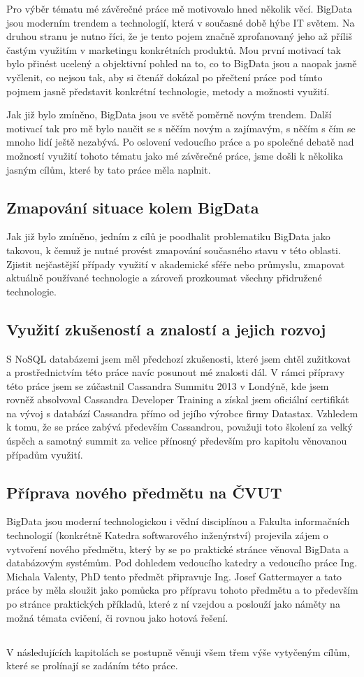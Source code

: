 Pro výběr tématu mé závěrečné práce mě motivovalo hned několik věcí. BigData jsou moderním trendem a technologií, která v současné době hýbe IT světem. Na druhou stranu je nutno říci, že je tento pojem značně zprofanovaný jeho až příliš častým využitím v marketingu konkrétních produktů. Mou první motivací tak bylo přinést ucelený a objektivní pohled na to, co to BigData jsou a naopak jasně vyčlenit, co nejsou tak, aby si čtenář dokázal po přečtení práce pod tímto pojmem jasně představit konkrétní technologie, metody a možnosti využití. 

Jak již bylo zmíněno, BigData jsou ve světě poměrně novým trendem. Další motivací tak pro mě bylo naučit se s něčím novým a zajímavým, s něčím s čím se mnoho lidí ještě nezabývá. Po oslovení vedoucího práce a po společné debatě nad možností využití tohoto tématu jako mé závěrečné práce, jsme došli k několika jasným cílům, které by tato práce měla naplnit. 

\subsection{Zmapování situace kolem BigData}
Jak již bylo zmíněno, jedním z cílů je poodhalit problematiku BigData jako takovou, k čemuž je nutné provést zmapování současného stavu v této oblasti. Zjistit nejčastější případy využití v akademické sféře nebo průmyslu, zmapovat aktuálně používané technologie a zároveň prozkoumat všechny přidružené technologie. 

\subsection{Využití zkušeností a znalostí a jejich rozvoj}
S NoSQL databázemi jsem měl předchozí zkušenosti, které jsem chtěl zužitkovat a prostřednictvím této práce navíc posunout mé znalosti dál. V rámci přípravy této práce jsem se zúčastnil Cassandra Summitu 2013 v Londýně, kde jsem rovněž absolvoval Cassandra Developer Training a získal jsem oficiální certifikát na vývoj s databází Cassandra přímo od jejího výrobce firmy Datastax. Vzhledem k tomu, že se práce zabývá především Cassandrou, považuji toto školení za velký úspěch a samotný summit za velice přínosný především pro kapitolu věnovanou případům využití.

\subsection{Příprava nového předmětu na ČVUT}
BigData jsou moderní technologickou i vědní disciplínou a Fakulta informačních technologií (konkrétně Katedra softwarového inženýrství) projevila zájem o vytvoření nového předmětu, který by se po praktické stránce věnoval BigData a databázovým systémům. Pod dohledem vedoucího katedry a vedoucího práce Ing. Michala Valenty, PhD tento předmět připravuje Ing. Josef Gattermayer a tato práce by měla sloužit jako pomůcka pro přípravu tohoto předmětu a to především po stránce praktických příkladů, které z ní vzejdou a poslouží jako náměty na možná témata cvičení, či rovnou jako hotová řešení. 

\subsection{}
V následujících kapitolách se postupně věnuji všem třem výše vytyčeným cílům, které se prolínají se zadáním této práce. 

